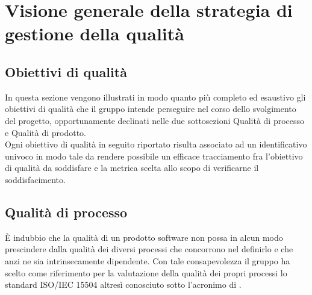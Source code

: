 \section{Visione generale della strategia di gestione della qualità}
	\subsection{Obiettivi di qualità}
	In questa sezione vengono illustrati in modo quanto più completo ed esaustivo gli obiettivi di qualità che il gruppo intende perseguire nel corso 	dello svolgimento del progetto, opportunamente declinati nelle due sottosezioni Qualità di processo e Qualità di prodotto.
	\\Ogni obiettivo di qualità in seguito riportato risulta associato ad un identificativo univoco in modo tale da rendere possibile un efficace 				tracciamento fra l'obiettivo di qualità da soddisfare e la metrica scelta allo scopo di verificarne il soddisfacimento.

	\subsection{Qualità di processo}
	È indubbio che la qualità di un prodotto software non possa in alcun modo prescindere dalla qualità dei diversi processi che concorrono nel definirlo e 	che anzi ne sia intrinsecamente dipendente. Con tale consapevolezza il gruppo ha scelto come riferimento per la valutazione della qualità dei propri 		processi lo standard ISO/IEC 15504 altresì conosciuto sotto l'acronimo di .
